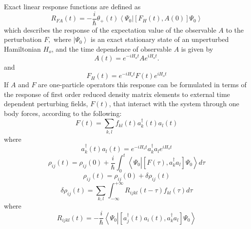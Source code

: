 \documentclass[aps,preprint]{revtex4}%
\begin{document}
Exact linear response functions are defined as
\begin{equation}
R_{FA}\left(  t\right)  =-\frac{i}{\hslash}\theta_{+}\left(  t\right)
\left\langle \Psi_{0}\left\vert \left[  F_{H}\left(  t\right)  ,A\left(
0\right)  \right]  \right.  \Psi_{0}\right\rangle
\end{equation}
which describes the response of the expectation value of the observable $A$ to
the perturbation $F,$ where $\left\vert \Psi_{0}\right\rangle $ is an exact
stationary state of an unperturbed Hamiltonian $H_{o}$, and the time
dependence of observable $A$ is given by
\begin{equation}
A\left(  t\right)  =e^{-iH_{o}t}Ae^{iH_{o}t}.
\end{equation}
and
\begin{equation}
F_{H}\left(  t\right)  =e^{-iH_{o}t}F\left(  t\right)  e^{iH_{o}t}%
\end{equation}
If $A$ and $F$ are one-particle operators this response can be formulated in
terms of the response of first order reduced density matrix elements to
external time dependent perturbing fields, $F(t)$, that interact with the
system through one body forces, according to the following:%
\begin{equation}
F(t)=\sum_{k,l}f_{kl}\left(  t\right)  a_{k}^{\dagger}\left(  t\right)
a_{l}\left(  t\right)
\end{equation}
where
\begin{equation}
a_{k}^{\dagger}\left(  t\right)  a_{l}\left(  t\right)  =e^{-iH_{o}t}%
a_{k}^{\dagger}a_{l}e^{iH_{o}t}%
\end{equation}%
\begin{equation}
\rho_{ij}\left(  t\right)  =\rho_{ij}\left(  0\right)  +\frac{i}{\hslash}%
\int_{0}^{t}\left\langle \Psi_{0}\left\vert \left[  F\left(  \tau\right)
,a_{k}^{\dagger}a_{l}\right]  \right.  \Psi_{0}\right\rangle d\tau
\end{equation}%
\begin{equation}
\rho_{ij}\left(  t\right)  =\rho_{ij}\left(  0\right)  +\delta\rho_{ij}\left(
t\right)
\end{equation}%
\begin{equation}
\delta\rho_{ij}\left(  t\right)  =\sum_{k,l}\int_{-\infty}^{+\infty}%
R_{ijkl}\left(  t-\tau\right)  f_{kl}\left(  \tau\right)  d\tau
\end{equation}
where
\begin{equation}
R_{ijkl}\left(  t\right)  =-\frac{i}{\hslash}\left\langle \Psi_{0}\left\vert
\left[  a_{j}^{\dagger}\left(  t\right)  a_{i}\left(  t\right)  ,a_{k}%
^{\dagger}a_{l}\right]  \right.  \Psi_{0}\right\rangle
\end{equation}
\end{document}
